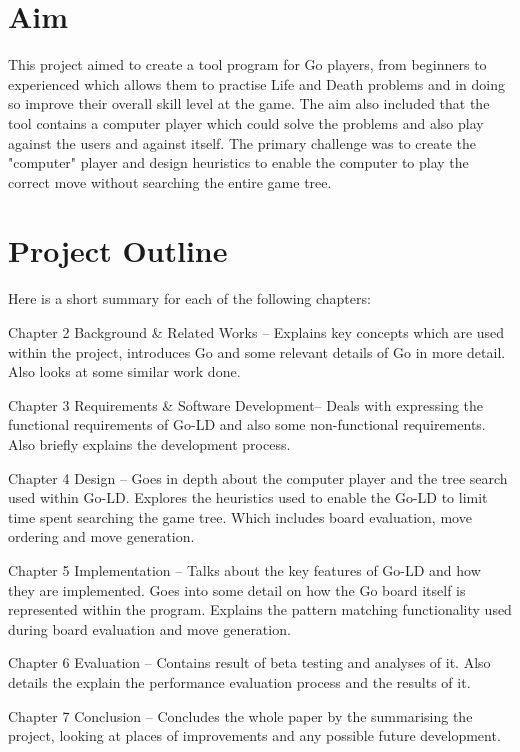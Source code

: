 \documentclass{l4proj}
\begin{document}
\section{Aim}
This project aimed to create a tool program for Go players, from beginners to experienced which allows them to practise Life and Death problems and in doing so improve their overall skill level at the game.  The aim also included that the tool contains a computer player which could solve the problems and also play against the users and against itself. The primary challenge was to create the  "computer" player and design heuristics to enable the computer to play the correct move without searching the entire game tree.

\section{Project Outline}

Here is a short summary for each of the following chapters:

Chapter 2 Background \& Related Works – Explains key concepts which are used within the project, introduces Go and some relevant details of Go in more detail. Also looks at some similar work done.

Chapter 3 Requirements \& Software Development– Deals with expressing the functional requirements of Go-LD and also some non-functional requirements. Also briefly explains the development process.


Chapter 4 Design – Goes in depth about the computer player and the tree search used within Go-LD.  Explores the heuristics used to enable the Go-LD to limit time spent searching the game tree. Which includes board evaluation, move ordering and move generation.

Chapter 5 Implementation – Talks about the key features of Go-LD and how they are implemented. Goes into some detail on how the Go board itself is represented within the program. Explains the pattern matching functionality used during board evaluation and move generation.

Chapter 6 Evaluation – Contains result of beta testing and analyses of it. Also details the explain the performance evaluation process and the results of it.

Chapter 7 Conclusion – Concludes the whole paper by the summarising the project, looking at places of improvements and any possible future development.
\end{document}
